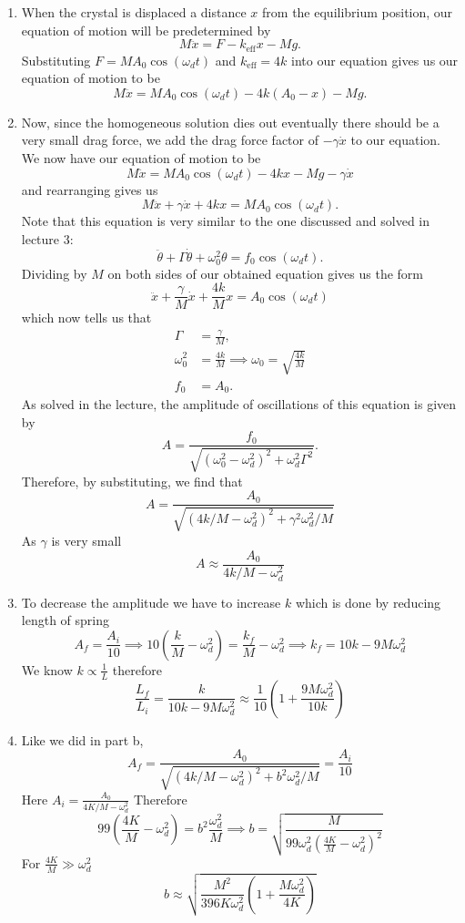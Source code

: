 \begin{sol}
\begin{enumerate}[label=\textbf{(\alph*)}]
\item When the crystal is displaced a distance $x$ from the equilibrium position, our equation of motion will be predetermined by 
\[M\ddot{x} = F - k_{\text{eff}} x - Mg.\]
Substituting $F = MA_0 \cos (\omega_d t)$ and $k_{\text{eff}} = 4k$ into our equation gives us our equation of motion to be
\[\boxed{M\ddot{x} = MA_0 \cos (\omega_d t) - 4k (A_0 - x) - Mg}.\]

\item Now, since the homogeneous solution dies out eventually there should be a very small drag force, we add the drag force factor of $-\gamma \dot{x}$ to our equation. We now have our equation of motion to be 
\[M\ddot{x} = MA_0 \cos (\omega_d t) - 4kx - Mg - \gamma \dot{x}\]
and rearranging gives us 
\[M\ddot{x} + \gamma \dot{x} + 4kx = MA_0 \cos (\omega_d t).\]
Note that this equation is very similar to the one discussed and solved in lecture 3:
\[\ddot\theta + \Gamma \dot\theta + \omega_0^2 \theta = f_0 \cos (\omega_d t).\]
Dividing by $M$ on both sides of our obtained equation gives us the form 
\[\ddot{x} + \frac{\gamma}{M}\dot{x} + \frac{4k}{M}x = A_0 \cos (\omega_d t)\]
which now tells us that 
\begin{align*}
    \Gamma &= \frac{\gamma}{M},\\
    \omega_0^2 &= \frac{4k}{M}\implies \omega_0 = \sqrt{\frac{4k}{M}}\\
    f_0 &= A_0.
\end{align*}
As solved in the lecture, the amplitude of oscillations of this equation is given by 
\[A = \frac{f_0}{\sqrt{(\omega_0^2 - \omega_d^2)^2 + \omega_d^2\Gamma^2}}.\]
Therefore, by substituting, we find that 
\[A = {\frac{A_0}{\sqrt{(4k/M - \omega_d^2)^2 + \gamma^2\omega_d^2/M}}}\]
As $\gamma$ is very small $$\boxed{A \approx  {\frac{A_0}{4k/M - \omega_d^2}}}$$
\item To decrease the amplitude we have to increase $k$ which is done by reducing length of spring $$A_f = \frac{A_i}{10} \implies 10\left(\frac{k}{M} - \omega_d^2\right)= \frac{k_f}{M} - \omega_d^2 \implies k_f = 10k - 9M\omega_d^2 $$
We know $k \propto \frac{1}{L}$ therefore $$\frac{L_f}{L_i} = \frac{k}{10k - 9M\omega_d^2} \approx \frac{1}{10} \left(1 + \frac{9M\omega_d^2}{10k}\right)$$
\item Like we did in part b, \[A_f = {\frac{A_0}{\sqrt{(4k/M - \omega_d^2)^2 + b^2\omega_d^2/M}}} = \frac{A_i}{10}\] Here $A_i = \frac{A_0}{4K/M - \omega_d^2}$
Therefore $$99\left(\frac{4K}{M} - \omega_d^2\right) = b^2 \frac{\omega_d^2}{M}\implies b = \sqrt{\frac{M}{99\omega_d^2\left(\frac{4K}{M}- \omega_d^2\right)^2}}$$
For $\frac{4K}{M} \gg \omega_d^2$ $$b \approx \sqrt{\frac{M^2}{396K\omega_d^2}\left(1+\frac{M\omega_d^2}{4K}\right)} $$
\end{enumerate}
\end{sol}